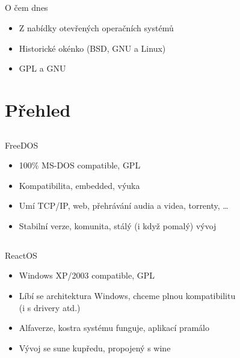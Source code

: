 \documentclass{beamer}
\begin{document}
\subsection{}
\begin{frame}{O čem dnes}
\begin{itemize}
\item Z nabídky otevřených operačních systémů
\item Historické okénko (BSD, GNU a Linux)
\item GPL a GNU
\end{itemize}
\end{frame}


\section{Přehled}

\subsection{}
\begin{frame}{FreeDOS}
\begin{itemize}
\item 100\% MS-DOS compatible, GPL
\item Kompatibilita, embedded, výuka
\item Umí TCP/IP, web, přehrávání audia a videa, torrenty, \dots
\item Stabilní verze, komunita, stálý (i když pomalý) vývoj
\end{itemize}
\end{frame}

\subsection{}
\begin{frame}{ReactOS}
\begin{itemize}
\item Windows XP/2003 compatible, GPL
\item Líbí se architektura Windows, chceme plnou kompatibilitu\\ (i s drivery atd.)
\item Alfaverze, kostra systému funguje, aplikací pramálo
\item Vývoj se sune kupředu, propojený s wine
\end{itemize}
\end{frame}
\end{document}
